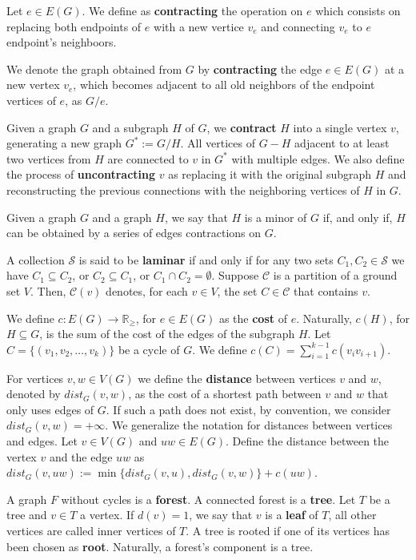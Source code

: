Let \(e \in E(G)\). We define as \textbf{contracting} the operation on \(e\) which consists on replacing both endpoints of \(e\) with a new vertice \(v_e\) and connecting \(v_e\) to \(e\) endpoint's neighboors.

We denote the graph obtained from \(G\) by \textbf{contracting} the edge \(e \in E(G)\) at a new vertex \(v_e\), which becomes adjacent to all old neighbors of the endpoint vertices of \(e\), as \(G / e\).

Given a graph \(G\) and a subgraph \(H\) of \(G\), we \textbf{contract} \(H\) into a single vertex \(v\), generating a new graph \(G^\ast := G / H\). All vertices of \(G - H\) adjacent to at least two vertices from \(H\) are connected to \(v\) in \(G^\ast\) with multiple edges. We also define the process of \textbf{uncontracting} \(v\) as replacing it with the original subgraph \(H\) and reconstructing the previous connections with the neighboring vertices of \(H\) in \(G\).

Given a graph \(G\) and a graph \(H\), we say that \(H\) is a minor of \(G\) if, and only if, \(H\) can be obtained by a series of edges contractions on \(G\).

A collection \(\mathcal{S}\) is said to be \textbf{laminar} if and only if for any two sets \(C_1, C_2 \in \mathcal{S}\) we have \(C_1 \subseteq C_2\), or \(C_2 \subseteq C_1\), or \(C_1 \cap C_2 = \emptyset\). Suppose \(\mathcal{C}\) is a partition of a ground set \(V\). Then, \(\mathcal{C}(v)\) denotes, for each \(v \in V\), the set \(C \in \mathcal{C}\) that contains \(v\).

We define \(c \colon E(G) \to \mathbb{R}_\ge\), for \(e \in E(G)\) as the \textbf{cost} of \(e\). Naturally, \(c(H)\), for \(H \subseteq G\), is the sum of the cost of the edges of the subgraph \(H\). Let \(C = \{(v_1, v_2, \dots, v_k)\}\) be a cycle of \(G\). We define \(c(C) = \sum_{i=1}^{k-1} c(v_i v_{i+1})\).

For vertices \(v, w \in V(G)\) we define the \textbf{distance} between vertices $v$ and $w$, denoted by \(dist_G(v, w)\), as the cost of a shortest path between \(v\) and \(w\) that only uses edges of \(G\). If such a path does not exist, by convention, we consider \(dist_G(v, w) = +\infty\). We generalize the notation for distances between vertices and edges. Let \(v \in V(G)\) and \(uw \in E(G)\). Define the distance between the vertex \(v\) and the edge \(uw\) as \(dist_G(v, uw) := \min\{dist_G(v, u), dist_G(v, w)\} + c(uw)\).

A graph \(F\) without cycles is a \textbf{forest}. A connected forest is a \textbf{tree}. Let \(T\) be a tree and \(v \in T\) a vertex. If \(d(v) = 1\), we say that \(v\) is a \textbf{leaf} of \(T\), all other vertices are called inner vertices of \(T\). A tree is rooted if one of its vertices has been chosen as \textbf{root}. Naturally, a forest's component is a tree. 

